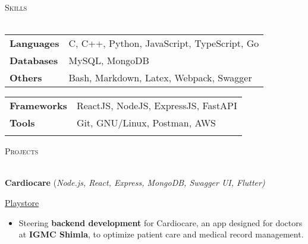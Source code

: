 \documentclass[a4paper]{article}
\newcommand{\bulletSep} { \vspace{2.5mm} }
\newcommand{\sectionSep} { \vspace{3.5mm} }
\newcommand{\lineunder} {
    \vspace*{-8pt} \\
    \hspace*{-15pt} \hrulefill \\
}
\newcommand{\header} [1] {
    {\hspace*{-18pt}\vspace*{6pt} {
        \fontfamily{qcs}\selectfont \large \scshape #1
    }}
    \vspace*{-6pt} \lineunder
    \vspace{1.1mm}
}
\newcommand{\experienceItem}[5]{
    \textbf{#1} \hfill #2 \\
    \textit{#3} \hfill #4 \\
    #5
}
\newcommand{\linkFont}[1]{
    {\fontfamily{lmtt}\selectfont#1}
}
\newcommand{\link}[2]{
    {\fontfamily{lmtt}\selectfont\href{#1}{#2}}
}
\newcommand{\projectItem}[5]{
    {\textbf{#1}} {(\sl #2)}\hfill
    \ifx&#3&%
    \link{#4}{Github}\\
    \else
    \linkFont{\href{#3}{Live Preview}~|~\href{#4}{Github}}\\
    \fi
    \vspace{2pt}
    \begin{itemize}
        #5
    \end{itemize}
}
\newcommand{\playstoreProjectItem}[4]{
    {\textbf{#1}} {(\sl #2)}\hfill
    \linkFont{\href{#3}{Playstore}}\\
    \vspace{2pt}
    \begin{itemize}
        #4
    \end{itemize}
}
\begin{document}

\sectionSep


\header{Skills}
\begin{minipage}[t]{0.52\textwidth}
    \begin{tabular}{@{}ll}
        \textbf{Languages} & C, C++, Python, JavaScript, TypeScript, Go \\
        \textbf{Databases} & MySQL, MongoDB                             \\
        \textbf{Others}    & Bash, Markdown, Latex, Webpack, Swagger
    \end{tabular}
\end{minipage}
\hfill
\begin{minipage}[t]{0.47\textwidth}
    \begin{tabular}{@{}ll}
        \textbf{Frameworks} & ReactJS, NodeJS, ExpressJS, FastAPI \\
        \textbf{Tools}      & Git, GNU/Linux, Postman, AWS        \\
        \textbf{}           &                                     \\
    \end{tabular}
\end{minipage}
\sectionSep


\header{Projects}

\playstoreProjectItem{Cardiocare}{Node.js, React, Express, MongoDB, Swagger UI, Flutter}{https://play.google.com/store/apps/details?id=com.cardio.care}{
    \item Steering \textbf{backend development} for Cardiocare, an app designed for doctors at \textbf{IGMC Shimla}, to optimize patient care and medical record management.
}
\bulletSep

\end{document}
